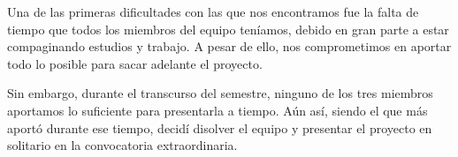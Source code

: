 Una de las primeras dificultades con las que nos encontramos fue la falta de tiempo que todos los miembros del equipo teníamos, debido en gran parte a estar compaginando estudios y trabajo. A pesar de ello, nos comprometimos en aportar todo lo posible para sacar adelante el proyecto.

Sin embargo, durante el transcurso del semestre, ninguno de los tres miembros aportamos lo suficiente para presentarla a tiempo. Aún así, siendo el que más aportó durante ese tiempo, decidí disolver el equipo y presentar el proyecto en solitario en la convocatoria extraordinaria.